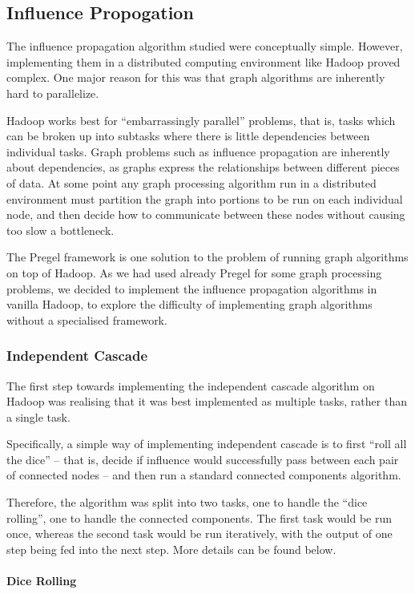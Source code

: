 \subsection{Influence Propogation}

The influence propagation algorithm studied were conceptually simple. However, implementing them in a distributed computing environment like Hadoop proved complex. One major reason for this was that graph algorithms are inherently hard to parallelize. 

Hadoop works best for ``embarrassingly parallel'' problems, that is, tasks which can be broken up into subtasks where there is little dependencies between individual tasks. Graph problems such as influence propagation are inherently about dependencies, as graphs express the relationships between different pieces of data. At some point any graph processing algorithm run in a distributed environment must partition the graph into portions to be run on each individual node, and then decide how to communicate between these nodes without causing too slow a bottleneck.

The Pregel framework is one solution to the problem of running graph algorithms on top of Hadoop. As we had used already Pregel for some graph processing problems, we decided to implement the influence propagation algorithms in vanilla Hadoop, to explore the difficulty of implementing graph algorithms without a specialised framework.

\subsubsection{Independent Cascade}

The first step towards implementing the independent cascade algorithm on Hadoop was realising that it was best implemented as multiple tasks, rather than a single task.

Specifically, a simple way of implementing independent cascade is to first ``roll all the dice'' -- that is, decide if influence would successfully pass between each pair of connected nodes -- and then run a standard connected components algorithm.

Therefore, the algorithm was split into two tasks, one to handle the ``dice rolling'', one to handle the connected components. The first task would be run once, whereas the second task would be run iteratively, with the output of one step being fed into the next step. More details can be found below.

\paragraph{Dice Rolling}


